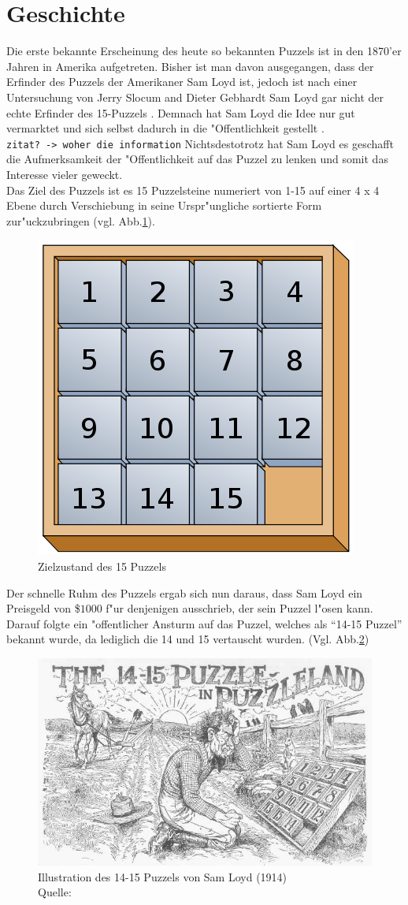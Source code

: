 \section{Geschichte} %
\label{cha:Geschichte}
Die erste bekannte Erscheinung des heute so bekannten Puzzels ist in den 1870'er Jahren in Amerika aufgetreten. Bisher ist man davon ausgegangen, dass der Erfinder des Puzzels der Amerikaner Sam Loyd ist, jedoch ist nach einer Untersuchung von Jerry Slocum and Dieter Gebhardt Sam Loyd gar nicht der echte Erfinder des 15-Puzzels \autocite{anchor-puzzle:book, the-15-puzzle:online}. Demnach hat Sam Loyd die Idee nur gut vermarktet und sich selbst dadurch in die "Offentlichkeit gestellt \autocite{wiki-15-puzzle:online}.\\
\texttt{zitat? -> woher die information}
Nichtsdestotrotz hat Sam Loyd es geschafft die Aufmerksamkeit der "Offentlichkeit auf das Puzzel zu lenken und somit das Interesse vieler geweckt.\\
Das Ziel des Puzzels ist es 15 Puzzelsteine numeriert von 1-15 auf einer 4 x 4 Ebene durch Verschiebung in seine Urspr"ungliche sortierte Form zur"uckzubringen (vgl. Abb.\ref{fig:puzzle-end}).
\begin{figure}[H]
    \centering
    \includegraphics[width=.3\textwidth,keepaspectratio]{img/Fifteen_puzzle.png}
    \captionsetup{format=hang}
    \caption[Zielzustand des 15 Puzzels]{\label{fig:puzzle-end}Zielzustand des 15 Puzzels}
\end{figure}
Der schnelle Ruhm des Puzzels ergab sich nun daraus, dass Sam Loyd ein Preisgeld von \$$1000$ f"ur denjenigen ausschrieb, der sein Puzzel l"osen kann. Darauf folgte ein "offentlicher Ansturm auf das Puzzel, welches als \enquote{14-15 Puzzel} bekannt wurde, da lediglich die 14 und 15 vertauscht wurden. (Vgl. Abb.\ref{fig:puzzle-illustration})
\begin{figure}[H]
    \centering
    \includegraphics[width=.6\textwidth,keepaspectratio]{img/sam-loyd-puzzle-illustration.jpg}
    \captionsetup{format=hang}
    \caption[Illustration des 14-15 Puzzels von Sam Loyd]{\label{fig:puzzle-illustration}Illustration des 14-15 Puzzels von Sam Loyd (1914) \\Quelle: \cite[pp. 234-235]{loyd-cyclopedia:book}}
\end{figure}
